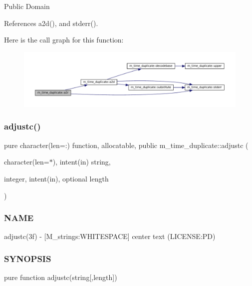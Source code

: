 Public Domain 

References a2d(), and stderr().

Here is the call graph for this function\+:\nopagebreak
\begin{figure}[H]
\begin{center}
\leavevmode
\includegraphics[width=350pt]{namespacem__time__duplicate_a9e2a87974ffb9b81dcfb0ecee076180f_cgraph}
\end{center}
\end{figure}
\mbox{\label{namespacem__time__duplicate_a487dbbb116d2c7022b39869d4990cf6f}} 
\subsubsection{\texorpdfstring{adjustc()}{adjustc()}}
{\footnotesize\ttfamily pure character(len=\+:) function, allocatable, public m\+\_\+time\+\_\+duplicate\+::adjustc (\begin{DoxyParamCaption}\item[{character(len=$\ast$), intent(in)}]{string,  }\item[{integer, intent(in), optional}]{length }\end{DoxyParamCaption})}



\subsubsection*{N\+A\+ME}

adjustc(3f) -\/ \mbox{[}M\+\_\+strings\+:W\+H\+I\+T\+E\+S\+P\+A\+CE\mbox{]} center text (L\+I\+C\+E\+N\+SE\+:PD) 

\subsubsection*{S\+Y\+N\+O\+P\+S\+IS}

pure function adjustc(string\mbox{[},length\mbox{]})

